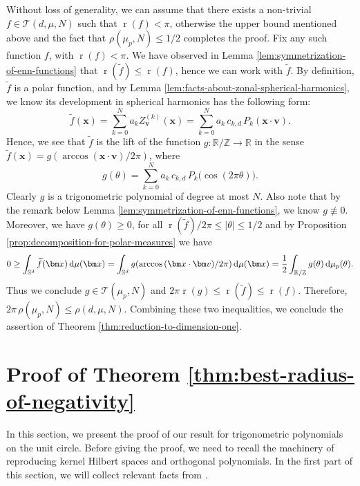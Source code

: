 \documentclass[reqno, a4paper]{amsart}
\def\R{\mathbb{R}}
\def\T{\mathbb{R}/\mathbb{Z}}
\renewcommand{\d}{\text{\rm d}}
\newcommand{\Sd}{\mathbb{S}^d}
\newcommand{\x}{{\bm x}}
\renewcommand{\v}{{\bm v}}
\newcommand{\wt}{\widetilde}
\renewcommand{\r}{\operatorname{r}}
\theoremstyle{plain}
\theoremstyle{definition}
\theoremstyle{remarkstyle}
\numberwithin{equation}{section}
\begin{document}
Without loss of generality, we can assume that there exists a non-trivial $f\in \mathcal{T}(d, \mu, N)$ such that $\r(f)<\pi$, otherwise the upper bound mentioned above and the fact that $\rho(\mu_p, N)\leq 1/2$ completes the proof. Fix any such function $f$, with $\r(f)<\pi$. We have observed in Lemma \ref{lem:symmetrization-of-enn-functions} that $\r(\wt f)\leq \r(f)$, hence we can work with $\wt f$. By definition, $\wt f$ is a polar function, and by Lemma \ref{lem:facts-about-zonal-spherical-harmonics}, we know its development in spherical harmonics has the following form:
\begin{equation*}
    \wt f(\x)=\sum_{k=0}^{N} a_k Z_{\v}^{(k)}(\x)=\sum_{k=0}^{N} a_k \,c_{k, d}\, P_k(\x\cdot\v).
\end{equation*}
Hence, we see that $\wt f$ is the lift of the function $g:\T\to \R$ in the sense $\wt f(\x)=g(\arccos(\x\cdot\v)/2\pi)$, where
\begin{equation*}
    g(\theta)=\sum_{k=0}^{N} a_k\, c_{k, d}\,  P_k\bigl(\cos(2\pi \theta)\bigr).
\end{equation*}
Clearly $g$ is a trigonometric polynomial of degree at most $N$. Also note that by the remark below Lemma \ref{lem:symmetrization-of-enn-functions}, we know $g\not \equiv 0$. Moreover, we have $g(\theta)\geq 0$, for all $\r(\wt f)/2\pi \leq \lvert \theta\rvert\leq 1/2$ and by Proposition \ref{prop:decomposition-for-polar-measures} we have
\begin{equation*}
    0\geq \int_{\Sd} \wt{f}(\x) \, \d\mu(\x)=\int_{\Sd} g(\arccos{(\x \cdot \v)}/2\pi) \, \d\mu(\x) = \frac{1}{2}\int_{\T} g(\theta) \, \d\mu_p(\theta).
\end{equation*}
Thus we conclude  $g\in \mathcal{T}(\mu_p, N)$ and $2\pi \r(g)\leq \r(\wt f)\leq \r(f)$. Therefore, $2\pi \,\rho(\mu_p, N) \leq \rho(d, \mu, N)$.
Combining these two inequalities, we conclude the assertion of Theorem \ref{thm:reduction-to-dimension-one}.

\section{Proof of Theorem \ref{thm:best-radius-of-negativity}}

In this section, we present the proof of our result for trigonometric polynomials on the unit circle. Before giving the proof, we need to recall the machinery of reproducing kernel Hilbert spaces and orthogonal polynomials. In the first part of this section, we will collect relevant facts from \cite{LiReproducingKernelHilbertSpaces1997, LiTrigonometricExtremalFunctionsErdosTuran1999}.  
\end{document}
